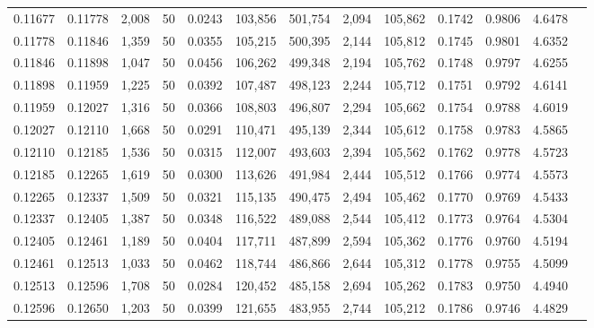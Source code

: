 \begin{tabular}{rrrrrrrrrrrrr}
0.11677 & 0.11778 & 2,008 &  50 &                                     0.0243 & 103,856 & 501,754 &   2,094 & 105,862 & 0.1742 & 0.9806 & 4.6478 \\
0.11778 & 0.11846 & 1,359 &  50 &                                     0.0355 & 105,215 & 500,395 &   2,144 & 105,812 & 0.1745 & 0.9801 & 4.6352 \\
0.11846 & 0.11898 & 1,047 &  50 &                                     0.0456 & 106,262 & 499,348 &   2,194 & 105,762 & 0.1748 & 0.9797 & 4.6255 \\
0.11898 & 0.11959 & 1,225 &  50 &                                     0.0392 & 107,487 & 498,123 &   2,244 & 105,712 & 0.1751 & 0.9792 & 4.6141 \\
0.11959 & 0.12027 & 1,316 &  50 &                                     0.0366 & 108,803 & 496,807 &   2,294 & 105,662 & 0.1754 & 0.9788 & 4.6019 \\
0.12027 & 0.12110 & 1,668 &  50 &                                     0.0291 & 110,471 & 495,139 &   2,344 & 105,612 & 0.1758 & 0.9783 & 4.5865 \\
0.12110 & 0.12185 & 1,536 &  50 &                                     0.0315 & 112,007 & 493,603 &   2,394 & 105,562 & 0.1762 & 0.9778 & 4.5723 \\
0.12185 & 0.12265 & 1,619 &  50 &                                     0.0300 & 113,626 & 491,984 &   2,444 & 105,512 & 0.1766 & 0.9774 & 4.5573 \\
0.12265 & 0.12337 & 1,509 &  50 &                                     0.0321 & 115,135 & 490,475 &   2,494 & 105,462 & 0.1770 & 0.9769 & 4.5433 \\
0.12337 & 0.12405 & 1,387 &  50 &                                     0.0348 & 116,522 & 489,088 &   2,544 & 105,412 & 0.1773 & 0.9764 & 4.5304 \\
0.12405 & 0.12461 & 1,189 &  50 &                                     0.0404 & 117,711 & 487,899 &   2,594 & 105,362 & 0.1776 & 0.9760 & 4.5194 \\
0.12461 & 0.12513 & 1,033 &  50 &                                     0.0462 & 118,744 & 486,866 &   2,644 & 105,312 & 0.1778 & 0.9755 & 4.5099 \\
0.12513 & 0.12596 & 1,708 &  50 &                                     0.0284 & 120,452 & 485,158 &   2,694 & 105,262 & 0.1783 & 0.9750 & 4.4940 \\
0.12596 & 0.12650 & 1,203 &  50 &                                     0.0399 & 121,655 & 483,955 &   2,744 & 105,212 & 0.1786 & 0.9746 & 4.4829 \\

\end{tabular}
